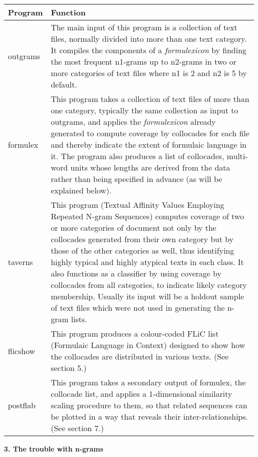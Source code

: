 \documentclass[11pt]{article}
\newenvironment{styleStandard}{\setlength\leftskip{0cm}\setlength\rightskip{0cm plus 1fil}\setlength\parindent{0cm}\setlength\parfillskip{0pt plus 1fil}\setlength\parskip{0cm plus 1pt}\writerlistparindent\writerlistleftskip\leavevmode\normalfont\normalsize\writerlistlabel\ignorespaces}{\unskip\vspace{0cm plus 1pt}\par}
\newcommand\writerlistleftskip{}
\newcommand\writerlistparindent{}
\newcommand\writerlistlabel{}
\begin{document}
\begin{flushleft}
\tablefirsthead{}
\tablehead{}
\tabletail{}
\tablelasttail{}
\begin{supertabular}{|m{0.9018598in}|m{3.5393598in}|}
\hline
\textbf{Program} &
\textbf{Function}\\\hline
outgrams &
The main input of this program is a collection of text files, normally divided into more than one text category. It compiles the components of a \textit{formulexicon} by finding the most frequent n1-grams up to n2-grams in two or more categories of text files where n1 is 2 and n2 is 5 by default.\\\hline
formulex &
This program takes a collection of text files of more than one category, typically the same collection as input to outgrams, and applies the \textit{formulexicon} already generated to compute coverage by collocades for each file and thereby indicate the extent of formulaic language in it. The program also produces a list of collocades, multi-word units whose lengths are derived from the data rather than being specified in advance (as will be explained below).\\\hline
taverns &
This program (Textual Affinity Values Employing Repeated N-gram Sequences) computes coverage of two or more categories of document not only by the collocades generated from their own category but by those of the other categories as well, thus identifying highly typical and highly atypical texts in each class. It also functions as a classifier by using coverage by collocades from all categories, to indicate likely category membership. Usually its input will be a holdout sample of text files which were not used in generating the n-gram lists.\\\hline
flicshow &
This program produces a colour-coded FLiC list (Formulaic Language in Context) designed to show how the collocades are distributed in various texts. (See section 5.)\\\hline
postflab &
This program takes a secondary output of formulex, the collocade list, and applies a 1-dimensional similarity scaling procedure to them, so that related sequences can be plotted in a way that reveals their inter-relationships. (See section 7.)\\\hline
\end{supertabular}
\end{flushleft}
\begin{styleStandard}
\textbf{3. The trouble with n-grams}
\end{styleStandard}
\end{document}
